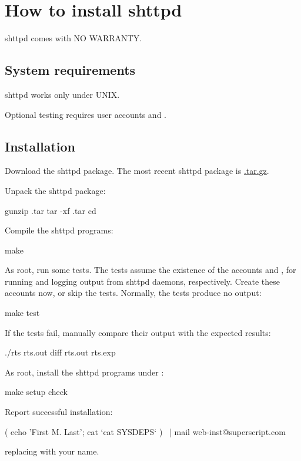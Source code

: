 
\chapter{How to install shttpd}

shttpd comes with NO WARRANTY.

\section{System requirements}
shttpd works only under UNIX.

Optional testing requires user accounts  and .

\section{Installation}
Download the shttpd package.  The most recent shttpd package is
\href{\version{shttpd}}{.tar.gz}.

Unpack the shttpd package:
\begin{code}
  gunzip .tar
  tar -xf .tar
  cd 
\end{code}

Compile the shttpd programs:
\begin{code}
  make
\end{code}

As root, run some tests.  The tests assume the existence of the
accounts  and , for running and logging
output from shttpd daemons, respectively.  Create these accounts now,
or skip the tests.  Normally, the tests produce no output:
\begin{code}
  make test
\end{code}
If the tests fail, manually compare their output with the expected results:
\begin{code}
  ./rts \>rts.out
  diff rts.out rts.exp
\end{code}

As root, install the shttpd programs under :
\begin{code}
  make setup check
\end{code}

Report successful installation:
\begin{code}
  ( echo 'First M. Last'; cat `cat SYSDEPS` ) \
  | mail web-inst@superscript.com
\end{code}
replacing  with your name.


